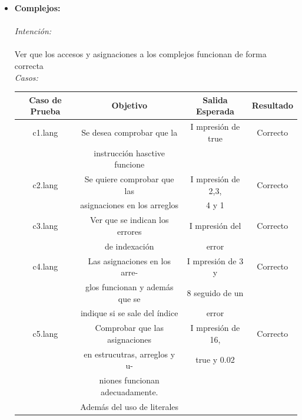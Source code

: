 \documentclass[11pt, spanish]{report}
\begin{document}
\begin{itemize}
\item \textbf{Complejos:}\\ \\
  \emph{Intenci\'on:}\\ \\
  Ver que los accesos y asignaciones a los complejos funcionan de forma correcta\\

  \emph{Casos:}\\ 

  \newpage
  \begin{table}[!hbp]
    \begin{tabular}{c c c c}
      \hline            
      \hline            
      Caso de Prueba & Objetivo                        & Salida Esperada      & Resultado \\ [0.5ex]
      \hline                          
      c1.lang        & Se desea comprobar que la       & I mpresi\'on de true & Correcto  \\ [1ex] 
                     & instrucci\'on hasctive funcione &                      &           \\ [1ex] 
      c2.lang        & Se quiere comprobar que las     & I mpresi\'on de 2,3, & Correcto  \\ [1ex] 
                     & asignaciones en los arreglos    & 4 y 1                &           \\ [1ex] 
      c3.lang        & Ver que se indican los errores  & I mpresi\'on del     & Correcto  \\ [1ex] 
                     & de indexaci\'on                 & error                &           \\ [1ex] 
      c4.lang        & Las asignaciones en los arre-   & I mpresi\'on de 3 y  & Correcto  \\ [1ex] 
                     & glos funcionan y además que se  & 8 seguido de un      &           \\ [1ex] 
                     & indique si se sale del \'indice & error                &           \\ [1ex] 
      c5.lang        & Comprobar que las asignaciones  & I mpresi\'on de 16,  & Correcto  \\ [1ex] 
                     & en estrucutras, arreglos y u-   & true y 0.02          &           \\ [1ex] 
                     & niones funcionan adecuadamente. &                      &           \\ [1ex] 
                     & Además del uso de literales     &                      &           \\ [1ex] 

\end{tabular}
\end{table}
\end{itemize}
\end{document}
